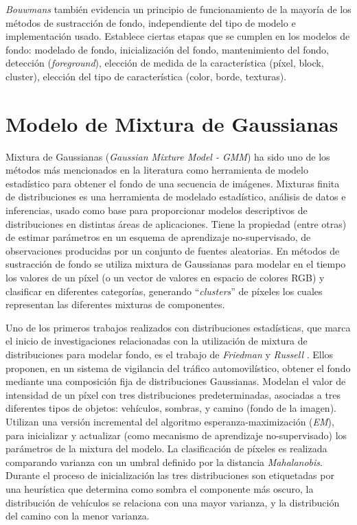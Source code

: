 \textit{Bouwmans}\cite{bouwmans_recent_2011} también evidencia un principio de funcionamiento de la mayoría de los métodos de sustracción de fondo, independiente del tipo de modelo e implementación usado. Establece ciertas etapas que se cumplen en los modelos de fondo: modelado de fondo, inicialización del fondo, mantenimiento del fondo, detección (\textit{foreground}), elección de medida de la característica (píxel, block, cluster), elección del tipo de característica (color, borde, texturas).

\section{Modelo de Mixtura de Gaussianas}

\indent Mixtura de Gaussianas (\textit{Gaussian Mixture Model - GMM}) ha sido uno de los métodos más mencionados en la literatura como herramienta de modelo estadístico para obtener el fondo de una secuencia de imágenes. Mixturas finita\cite{mclachlan_finite_2000} de distribuciones es una herramienta de modelado estadístico, análisis de datos e inferencias, usado como base para proporcionar modelos descriptivos de distribuciones en distintas áreas de aplicaciones. Tiene la propiedad (entre otras) de estimar parámetros en un esquema de aprendizaje no-supervisado, de observaciones producidas por un conjunto de fuentes aleatorias. En métodos de sustracción de fondo se utiliza mixtura de Gaussianas para modelar en el tiempo los valores de un píxel (o un vector de valores en espacio de colores RGB) y clasificar en diferentes categorías, generando ``\textit{clusters}'' de píxeles los cuales representan las diferentes mixturas de componentes.
 
\indent Uno de los primeros trabajos realizados con distribuciones estadísticas, que marca el inicio de investigaciones relacionadas con la utilización de mixtura de distribuciones para modelar fondo, es el trabajo de \textit{Friedman} y \textit{Russell} \cite{friedman_image_1997}. Ellos proponen, en un sistema de vigilancia del tráfico automovilístico, obtener el fondo mediante una composición fija de distribuciones Gaussianas. Modelan el valor de intensidad de un píxel con tres distribuciones predeterminadas, asociadas a tres diferentes tipos de objetos: vehículos, sombras, y camino (fondo de la imagen). Utilizan una versión incremental del algoritmo esperanza-maximización\cite{dempster_maximum_1977} (\textit{EM}), para inicializar y actualizar (como mecanismo de aprendizaje no-supervisado) los parámetros de la mixtura del modelo. La clasificación de píxeles es realizada comparando varianza con un umbral definido por la distancia \textit{Mahalanobis}. Durante el proceso de inicialización las tres distribuciones son etiquetadas por una heurística que determina como sombra el componente más oscuro, la distribución de vehículos se relaciona con una mayor varianza, y la distribución del camino con la menor varianza. 


